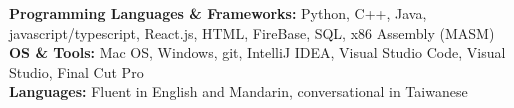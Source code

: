 

\begin{cvparagraph}

\textbf{Programming Languages \& Frameworks:} Python, C++, Java, javascript/typescript, React.js, HTML, FireBase, SQL, x86 Assembly (MASM)
\\[2pt]
\textbf{OS \& Tools:} Mac OS, Windows, git, IntelliJ IDEA, Visual Studio Code, Visual Studio, Final Cut Pro
\\[2pt]
\textbf{Languages:} Fluent in English and Mandarin, conversational in Taiwanese
\\[2pt]


\end{cvparagraph}
